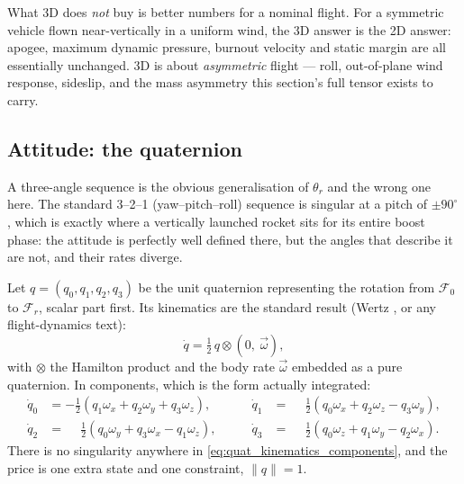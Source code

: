 What 3D does \emph{not} buy is better numbers for a nominal flight. For a symmetric vehicle flown
near-vertically in a uniform wind, the 3D answer is the 2D answer: apogee, maximum dynamic
pressure, burnout velocity and static margin are all essentially unchanged. 3D is about
\emph{asymmetric} flight --- roll, out-of-plane wind response, sideslip, and the mass asymmetry
this section's full tensor exists to carry.

\subsection{Attitude: the quaternion}\label{sec:3d_attitude}
A three-angle sequence is the obvious generalisation of $\theta_r$ and the wrong one here. The
standard 3--2--1 (yaw--pitch--roll) sequence is singular at a pitch of $\pm90^\circ$, which is
exactly where a vertically launched rocket sits for its entire boost phase: the attitude is
perfectly well defined there, but the angles that describe it are not, and their rates diverge.

Let $q=(q_0,q_1,q_2,q_3)$ be the unit quaternion representing the rotation from $\mathcal{F}_0$ to
$\mathcal{F}_r$, scalar part first. Its kinematics are the standard result (Wertz
\cite{wertz}, or any flight-dynamics text):
\begin{equation} \label{eq:quat_kinematics}
    \dot q = \tfrac12\, q \otimes \left(0,\ \vec\omega\right),
\end{equation}
with $\otimes$ the Hamilton product and the body rate $\vec\omega$ embedded as a pure quaternion.
In components, which is the form actually integrated:
\begin{equation} \label{eq:quat_kinematics_components}
    \begin{aligned}
        \dot q_0 &= -\tfrac12\left(q_1\omega_x + q_2\omega_y + q_3\omega_z\right), &\qquad
        \dot q_1 &= \phantom{-}\tfrac12\left(q_0\omega_x + q_2\omega_z - q_3\omega_y\right), \\
        \dot q_2 &= \phantom{-}\tfrac12\left(q_0\omega_y + q_3\omega_x - q_1\omega_z\right), &\qquad
        \dot q_3 &= \phantom{-}\tfrac12\left(q_0\omega_z + q_1\omega_y - q_2\omega_x\right).
    \end{aligned}
\end{equation}
There is no singularity anywhere in \autoref{eq:quat_kinematics_components}, and the price is one
extra state and one constraint, $\lVert q\rVert = 1$.

